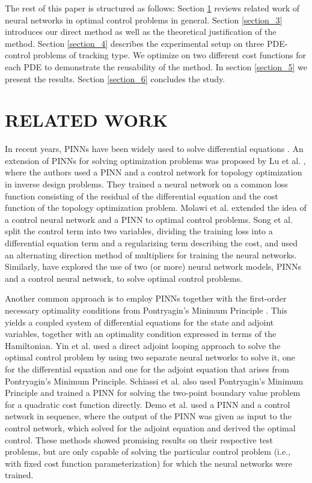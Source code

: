 \documentclass[final,1p,times]{elsarticle}
\theoremstyle{plain} %
\theoremstyle{definition} %
\theoremstyle{remark} %
\begin{document}
The rest of this paper is structured as follows: Section \ref{section_2} reviews related work of neural networks in optimal control problems in general. Section \ref{section_3} introduces our direct method as well as the theoretical justification of the method. Section \ref{section_4} describes the experimental setup on three PDE-control problems of tracking type. We optimize on two different cost functions for each PDE to demonstrate the reusability of the method. In section \ref{section_5} we present the results. Section \ref{section_6} concludes the study.

\section{RELATED WORK}\label{section_2}

In recent years, PINNs have been widely used to solve differential equations \cite{raissi2017physics,raissi2019physics,jagtap2022physics,kashefi2022physics,yang2021b}. An extension of PINNs for solving optimization problems was proposed by Lu et al. \cite{Lu2021}, where the authors used a PINN and a control network for topology optimization in inverse design problems. They trained a neural network on a common loss function consisting of the residual of the differential equation and the cost function of the topology optimization problem. Molawi et al. \cite{Molawi2023} extended the idea of a control neural network and a PINN to optimal control problems. Song et al. \cite{Song2023admm} split the control term into two variables, dividing the training loss into a differential equation term and a regularizing term describing the cost, and used an alternating direction method of multipliers for training the neural networks. Similarly, \cite{Demo2023,Alla2024,Tomasetto2024,barrystraume2025physics} have explored the use of two (or more) neural network models, PINNs and a control neural network, to solve optimal control problems. 

Another common approach is to employ PINNs together with the first-order necessary optimality conditions from Pontryagin’s Minimum Principle \cite{Pontryagin1956}. This yields a coupled system of differential equations for the state and adjoint variables, together with an optimality condition expressed in terms of the Hamiltonian. Yin et al. \cite{Yin2024AONN} used a direct adjoint looping approach to solve the optimal control problem by using two separate neural networks to solve it, one for the differential equation and one for the adjoint equation that arises from Pontryagin's Minimum Principle. Schiassi et al. \cite{schiassi2024pontryagin} also used Pontryagin's Minimum Principle and trained a PINN for solving the two-point boundary value problem for a quadratic cost function directly. Demo et al. \cite{Demo2023} used a PINN and a control network in sequence, where the output of the PINN was given as input to the control network, which solved for the adjoint equation and derived the optimal control. These methods showed promising results on their respective test problems, but are only capable of solving the particular control problem (i.e., with fixed cost function parameterization) for which the neural networks were trained.
\end{document}
